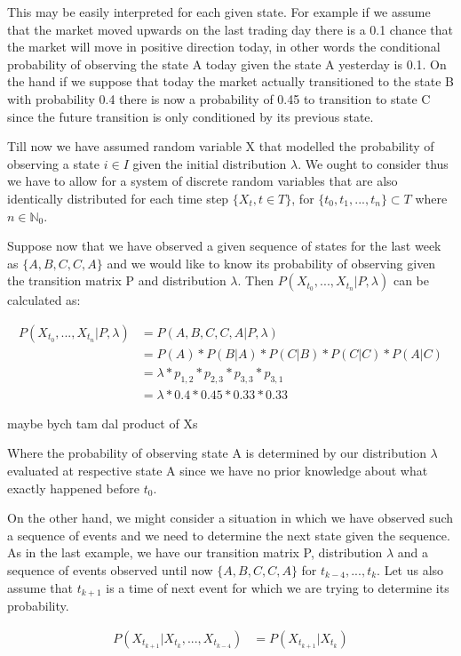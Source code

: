 This may be easily interpreted for each given state. For example if we assume that the market moved upwards on the last trading day there is a 0.1 chance that the market will move in positive direction today, in other words the conditional probability of observing the state A today given the state A yesterday is 0.1. On the hand if we suppose that today the market actually transitioned to the state B  with probability 0.4 there is now a probability of 0.45 to transition to state C since the future transition is only conditioned by its previous state. 

Till now we have assumed random variable X that modelled the probability of observing a state $i \in I$ given the initial distribution $\lambda$. We ought to consider  thus we have to allow for a system of discrete random variables that are also identically distributed for each time step $\{X_{t},t \in T \}$, for $\{t_0,t_1,...,t_n\} \subset T$ where $n \in \mathbb{N}_0$.

Suppose now that we have observed a given sequence of states for the last week as $\{A,B,C,C,A\}$ and we would like to know its probability of observing given the transition matrix P and distribution $\lambda$. Then $P(X_{t_0},...,X_{t_n}|P,\lambda)$ can be calculated as:

\begin{align*}
P(X_{t_0},...,X_{t_n}|P,\lambda) &= P(A,B,C,C,A|P,\lambda) \\
&= P(A) * P(B|A) * P(C|B) * P(C|C) * P(A|C) \\
&= \lambda * p_{1,2} * p_{2,3} * p_{3,3} * p_{3,1} \\
&= \lambda * 0.4 * 0.45 * 0.33 * 0.33
\end{align*}

maybe bych tam dal product of Xs

Where the probability of observing state A is determined by our distribution $\lambda$ evaluated at respective state A since we have no prior knowledge about what exactly happened before $t_0$. 

On the other hand, we might consider a situation in which we have observed such a sequence of events and we need to determine the next state given the sequence. As in the last example, we have our transition matrix P, distribution $\lambda$ and a sequence of events observed until now $\{A,B,C,C,A\}$ for $t_{k-4},...,t_{k}$. Let us also assume that $t_{k+1}$ is a time of next event for which we are trying to determine its probability.

\begin{align}
P(X_{t_{k+1}}|X_{t_{k}},...,X_{t_{k-4}}) &= P(X_{t_{k+1}}|X_{t_{k}})
\end{align}

